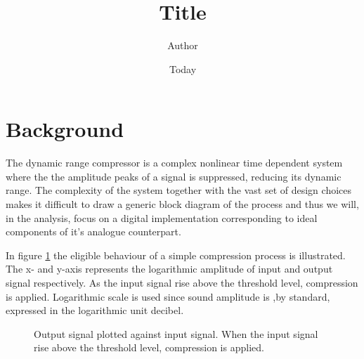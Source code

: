 \documentclass[]{article}
\begin{document}
\title{Title}
\author{Author}
\date{Today}
\maketitle
\section{Background}
The dynamic range compressor is a complex nonlinear time dependent system where the the amplitude peaks of a signal is suppressed, reducing its dynamic range. The complexity of the system together with the vast set of design choices makes it difficult to draw a generic block diagram of the process\cite{giannoullis}  and thus we will, in the analysis, focus on a digital implementation corresponding to ideal components of it's analogue counterpart. 

In figure \ref{fig:xy-graph} the eligible behaviour of a simple compression process is illustrated. The x- and y-axis represents the logarithmic amplitude of input and output signal respectively. As the input signal rise above the threshold level, compression is applied. Logarithmic scale is used since sound amplitude is ,by standard, expressed in the logarithmic unit decibel.

\begin{figure}[ht]
\centering

\caption{Output signal plotted against input signal. When the input signal rise above the threshold level, compression is applied.} 
\label{fig:xy-graph}
\end{figure}



\end{document}
